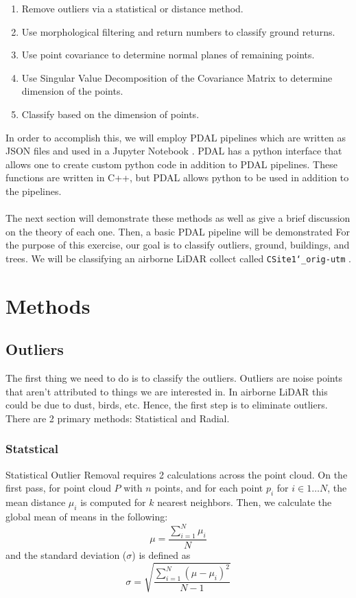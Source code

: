 \documentclass[11pt]{article}
\theoremstyle{definition}
\begin{document}
	\begin{enumerate}  
	\item Remove outliers via a statistical or distance method.
	\item Use morphological filtering and return numbers to classify ground returns.
	\item Use point covariance to determine normal planes of remaining points.
	\item Use Singular Value Decomposition of the Covariance Matrix to determine dimension of the points.
	\item Classify based on the dimension of points.
\end{enumerate}
In order to accomplish this, we will employ PDAL pipelines which are written as JSON files and used in a Jupyter Notebook  \cite{pdal}.  PDAL has a python interface that allows one to create custom python code in addition to PDAL pipelines.  These functions are written in C++, but PDAL allows python to be used in addition to the pipelines.
\\\\
The next section will demonstrate these methods as well as give a brief discussion on the theory of each one.  Then, a basic PDAL pipeline will be demonstrated  For the purpose of this exercise, our goal is to classify outliers, ground, buildings, and trees. We will be classifying an airborne LiDAR collect called \texttt{CSite1\char`_orig-utm} \cite{pdal}. 

\section{Methods}\label{methods}
\subsection{Outliers}\label{sub:outliers}
The first thing we need to do is to classify the outliers.  Outliers are noise points that aren't attributed to things we are interested in.  In airborne LiDAR this could be due to dust, birds, etc.  Hence, the first step is to eliminate outliers.  There are 2 primary methods: Statistical and Radial.
\subsubsection{Statstical}\label{subsub:stat}
Statistical Outlier Removal requires 2 calculations across the point cloud.  On the first pass, for point cloud $P$ with $n$ points, and for each point $p_i$ for $i\in 1 \ldots N$, the mean distance $\mu_i$ is computed for $k$ nearest neighbors.  Then, we calculate the global mean of means in the following:
\begin{equation}\label{eqn:average} 
\mu=\dfrac{\sum_{i=1}^{N} \mu_{i}}{N} 
\end{equation}
and the standard deviation ($\sigma$) is defined as
\begin{equation}\label{eqn:std} 
\sigma=\sqrt{\dfrac{\sum_{i=1}^{N} (\mu-\mu_{i})^2}{N-1}} 
\end{equation}
\end{document}
